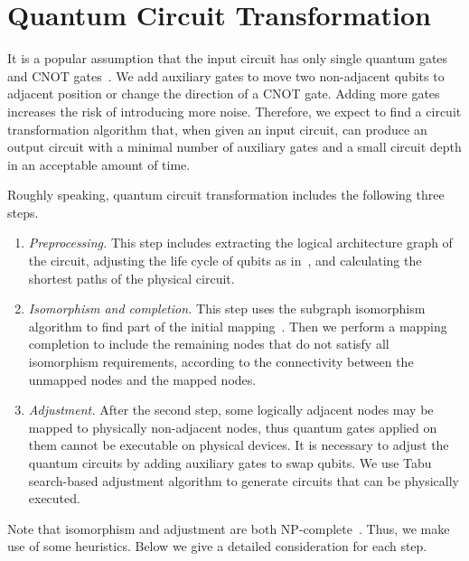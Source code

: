 \documentclass[journal]{IEEEtran}
\newcommand{\leaveout}[1]{}
\begin{document}
\section{Quantum Circuit Transformation}
\label{Problem Description and Solution Outline}
It is a popular assumption that the input circuit has only  single quantum gates and CNOT gates~\cite{1995Barenco,2005Mttnen}. We add auxiliary gates %
to move two non-adjacent qubits to adjacent position or change the direction of a CNOT gate. Adding more gates increases the risk of introducing more noise. Therefore,
we expect to find a circuit transformation algorithm that, when given an input circuit, can produce an output circuit with a minimal number of auxiliary gates and a small circuit depth in an acceptable amount of time.

Roughly speaking, quantum circuit transformation includes the following three steps.

\leaveout{ %
\begin{figure}[htbp] 
	\centering
	\texttt{[image: uml.jpg]}		 
	\caption{Circuit transformation process}
	\label{processing}	
	 \end{figure}
 } %

\begin{enumerate}
	\item \emph{Preprocessing.} 
	This step includes extracting the logical architecture graph of the circuit, adjusting the life cycle of qubits as in~\cite{2019Zhang},  and calculating the shortest paths of the physical circuit.
	\item \emph{Isomorphism and completion.} %
	This step uses the subgraph isomorphism algorithm to find part of the initial mapping~\cite{Sun2020}.
	Then we perform a mapping completion to include the remaining nodes that do not satisfy all isomorphism requirements, according to the connectivity between the unmapped nodes and the mapped nodes.
      \item \emph{Adjustment.} %
        After the second step, some logically adjacent nodes may be mapped to physically non-adjacent nodes, thus quantum gates applied on them cannot be executable on physical devices. It is necessary to adjust the quantum circuits by adding auxiliary gates to swap qubits. We use Tabu search-based adjustment algorithm to generate circuits that can be physically executed.
\end{enumerate}
Note that isomorphism and adjustment are both NP-complete~\cite{2018QubitSiraichi}. Thus, we make use of some heuristics. Below we give a detailed consideration for each step.
\end{document}
